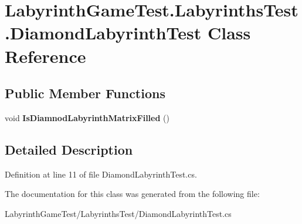 \hypertarget{class_labyrinth_game_test_1_1_labyrinths_test_1_1_diamond_labyrinth_test}{\section{Labyrinth\+Game\+Test.\+Labyrinths\+Test.\+Diamond\+Labyrinth\+Test Class Reference}
\label{class_labyrinth_game_test_1_1_labyrinths_test_1_1_diamond_labyrinth_test}
}
\subsection*{Public Member Functions}
\begin{DoxyCompactItemize}
\item 
\hypertarget{class_labyrinth_game_test_1_1_labyrinths_test_1_1_diamond_labyrinth_test_a5380f682a09e0486b59dd35a1d1f315b}{void {\bfseries Is\+Diamnod\+Labyrinth\+Matrix\+Filled} ()}\label{class_labyrinth_game_test_1_1_labyrinths_test_1_1_diamond_labyrinth_test_a5380f682a09e0486b59dd35a1d1f315b}

\end{DoxyCompactItemize}


\subsection{Detailed Description}


Definition at line 11 of file Diamond\+Labyrinth\+Test.\+cs.



The documentation for this class was generated from the following file\+:\begin{DoxyCompactItemize}
\item 
Labyrinth\+Game\+Test/\+Labyrinths\+Test/Diamond\+Labyrinth\+Test.\+cs\end{DoxyCompactItemize}
